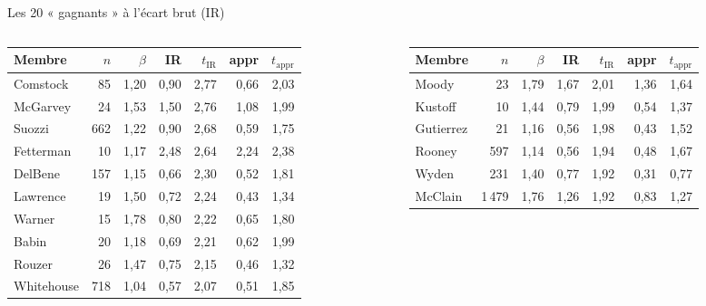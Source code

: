 \documentclass[11pt,aspectratio=169]{beamer}
\begin{document}
\begin{frame}{Les 20 « gagnants » à l'écart brut (IR)}
  \centering
  {\scriptsize
  \begin{columns}[T]
    \begin{column}{0.49\textwidth}\centering
      \begin{tabular}{@{}l r r r r r r@{}}
        \toprule
        Membre & $n$ & $\beta$ & IR & $t_{\mathrm{IR}}$ & appr & $t_{\mathrm{appr}}$\\\midrule
        Comstock & 85 & 1,20 & 0,90 & 2,77 & 0,66 & 2,03\\
        McGarvey & 24 & 1,53 & 1,50 & 2,76 & 1,08 & 1,99\\
        Suozzi & 662 & 1,22 & 0,90 & 2,68 & 0,59 & 1,75\\
        Fetterman & 10 & 1,17 & 2,48 & 2,64 & 2,24 & 2,38\\
        DelBene & 157 & 1,15 & 0,66 & 2,30 & 0,52 & 1,81\\
        Lawrence & 19 & 1,50 & 0,72 & 2,24 & 0,43 & 1,34\\
        Warner & 15 & 1,78 & 0,80 & 2,22 & 0,65 & 1,80\\
        Babin & 20 & 1,18 & 0,69 & 2,21 & 0,62 & 1,99\\
        Rouzer & 26 & 1,47 & 0,75 & 2,15 & 0,46 & 1,32\\
        Whitehouse & 718 & 1,04 & 0,57 & 2,07 & 0,51 & 1,85\\
        \bottomrule
      \end{tabular}
    \end{column}
    \begin{column}{0.49\textwidth}\centering
      \begin{tabular}{@{}l r r r r r r@{}}
        \toprule
        Membre & $n$ & $\beta$ & IR & $t_{\mathrm{IR}}$ & appr & $t_{\mathrm{appr}}$\\\midrule
        Moody & 23 & 1,79 & 1,67 & 2,01 & 1,36 & 1,64\\
        Kustoff & 10 & 1,44 & 0,79 & 1,99 & 0,54 & 1,37\\
        Gutierrez & 21 & 1,16 & 0,56 & 1,98 & 0,43 & 1,52\\
        Rooney & 597 & 1,14 & 0,56 & 1,94 & 0,48 & 1,67\\
        Wyden & 231 & 1,40 & 0,77 & 1,92 & 0,31 & 0,77\\
        McClain & 1\,479 & 1,76 & 1,26 & 1,92 & 0,83 & 1,27\\

\end{tabular}
\end{column}
\end{columns}}
\end{frame}
\end{document}
